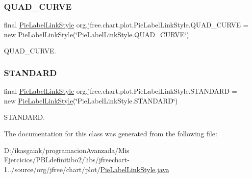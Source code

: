 \subsubsection{\texorpdfstring{Q\+U\+A\+D\+\_\+\+C\+U\+R\+VE}{QUAD\_CURVE}}
{\footnotesize\ttfamily final \mbox{\hyperlink{classorg_1_1jfree_1_1chart_1_1plot_1_1_pie_label_link_style}{Pie\+Label\+Link\+Style}} org.\+jfree.\+chart.\+plot.\+Pie\+Label\+Link\+Style.\+Q\+U\+A\+D\+\_\+\+C\+U\+R\+VE = new \mbox{\hyperlink{classorg_1_1jfree_1_1chart_1_1plot_1_1_pie_label_link_style}{Pie\+Label\+Link\+Style}}(\char`\"{}Pie\+Label\+Link\+Style.\+Q\+U\+A\+D\+\_\+\+C\+U\+R\+VE\char`\"{})\hspace{0.3cm}{\ttfamily [static]}}

Q\+U\+A\+D\+\_\+\+C\+U\+R\+VE. \mbox{\label{classorg_1_1jfree_1_1chart_1_1plot_1_1_pie_label_link_style_a53a4e0ffd909850c6dcc01435e579179}} 
\subsubsection{\texorpdfstring{S\+T\+A\+N\+D\+A\+RD}{STANDARD}}
{\footnotesize\ttfamily final \mbox{\hyperlink{classorg_1_1jfree_1_1chart_1_1plot_1_1_pie_label_link_style}{Pie\+Label\+Link\+Style}} org.\+jfree.\+chart.\+plot.\+Pie\+Label\+Link\+Style.\+S\+T\+A\+N\+D\+A\+RD = new \mbox{\hyperlink{classorg_1_1jfree_1_1chart_1_1plot_1_1_pie_label_link_style}{Pie\+Label\+Link\+Style}}(\char`\"{}Pie\+Label\+Link\+Style.\+S\+T\+A\+N\+D\+A\+RD\char`\"{})\hspace{0.3cm}{\ttfamily [static]}}

S\+T\+A\+N\+D\+A\+RD. 

The documentation for this class was generated from the following file\+:\begin{DoxyCompactItemize}
\item 
D\+:/ikasgaiak/programacion\+Avanzada/\+Mis Ejercicios/\+P\+B\+Ldefinitibo2/libs/jfreechart-\/1../source/org/jfree/chart/plot/\mbox{\hyperlink{_pie_label_link_style_8java}{Pie\+Label\+Link\+Style.\+java}}\end{DoxyCompactItemize}
